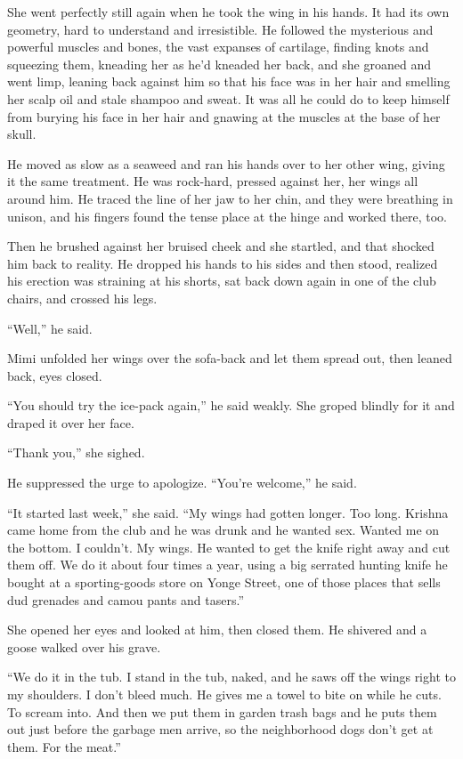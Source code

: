 \documentclass{article}
\begin{document}
She went perfectly still again when he took the wing in his hands.  It
had its own geometry, hard to understand and irresistible.  He
followed the mysterious and powerful muscles and bones, the vast
expanses of cartilage, finding knots and squeezing them, kneading her
as he'd kneaded her back, and she groaned and went limp, leaning back
against him so that his face was in her hair and smelling her scalp
oil and stale shampoo and sweat.  It was all he could do to keep
himself from burying his face in her hair and gnawing at the muscles
at the base of her skull.

He moved as slow as a seaweed and ran his hands over to her other
wing, giving it the same treatment.  He was rock-hard, pressed against
her, her wings all around him.  He traced the line of her jaw to her
chin, and they were breathing in unison, and his fingers found the
tense place at the hinge and worked there, too.

Then he brushed against her bruised cheek and she startled, and that
shocked him back to reality.  He dropped his hands to his sides and
then stood, realized his erection was straining at his shorts, sat
back down again in one of the club chairs, and crossed his legs.

``Well,'' he said.

Mimi unfolded her wings over the sofa-back and let them spread out,
then leaned back, eyes closed.

``You should try the ice-pack again,'' he said weakly.  She groped
blindly for it and draped it over her face.

``Thank you,'' she sighed.

He suppressed the urge to apologize.  ``You're welcome,'' he said.

``It started last week,'' she said.  ``My wings had gotten longer. 
Too long.  Krishna came home from the club and he was drunk and he
wanted sex.  Wanted me on the bottom.  I couldn't.  My wings.  He
wanted to get the knife right away and cut them off.  We do it about
four times a year, using a big serrated hunting knife he bought at a
sporting-goods store on Yonge Street, one of those places that sells
dud grenades and camou pants and tasers.''

She opened her eyes and looked at him, then closed them.  He shivered
and a goose walked over his grave.

``We do it in the tub.  I stand in the tub, naked, and he saws off the
wings right to my shoulders.  I don't bleed much.  He gives me a towel
to bite on while he cuts.  To scream into.  And then we put them in
garden trash bags and he puts them out just before the garbage men
arrive, so the neighborhood dogs don't get at them.  For the meat.''
\end{document}
